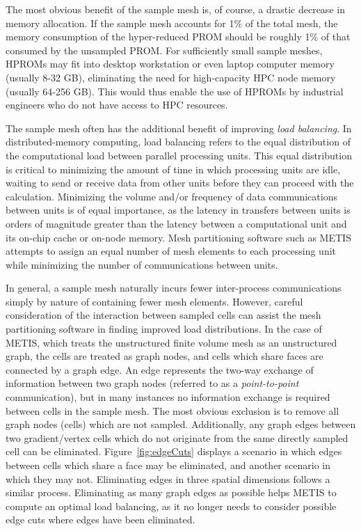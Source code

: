 The most obvious benefit of the sample mesh is, of course, a drastic decrease in memory allocation. If the sample mesh accounts for 1\% of the total mesh, the memory consumption of the hyper-reduced PROM should be roughly 1\% of that consumed by the unsampled PROM. For sufficiently small sample meshes, HPROMs may fit into desktop workstation or even laptop computer memory (usually 8-32 GB), eliminating the need for high-capacity HPC node memory (usually 64-256 GB). This would thus enable the use of HPROMs by industrial engineers who do not have access to HPC resources.

The sample mesh often has the additional benefit of improving \textit{load balancing}. In distributed-memory computing, load balancing refers to the equal distribution of the computational load between parallel processing units. This equal distribution is critical to minimizing the amount of time in which processing units are idle, waiting to send or receive data from other units before they can proceed with the calculation. Minimizing the volume and/or frequency of data communications between units is of equal importance, as the latency in transfers between units is orders of magnitude greater than the latency between a computational unit and its on-chip cache or on-node memory. Mesh partitioning software such as METIS~\cite{metis} attempts to assign an equal number of mesh elements to each processing unit while minimizing the number of communications between units.

In general, a sample mesh naturally incurs fewer inter-process communications simply by nature of containing fewer mesh elements. However, careful consideration of the interaction between sampled cells can assist the mesh partitioning software in finding improved load distributions. In the case of METIS, which treats the unstructured finite volume mesh as an unstructured graph, the cells are treated as graph nodes, and cells which share faces are connected by a graph edge. An edge represents the two-way exchange of information between two graph nodes (referred to as a \textit{point-to-point} communication), but in many instances no information exchange is required between cells in the sample mesh. The most obvious exclusion is to remove all graph nodes (cells) which are not sampled. Additionally, any graph edges between two gradient/vertex cells which do not originate from the same directly sampled cell can be eliminated. Figure~\ref{fig:edgeCuts} displays a scenario in which edges between cells which share a face may be eliminated, and another scenario in which they may not. Eliminating edges in three spatial dimensions follows a similar process. Eliminating as many graph edges as possible helps METIS to compute an optimal load balancing, as it no longer needs to consider possible edge cuts where edges have been eliminated.

